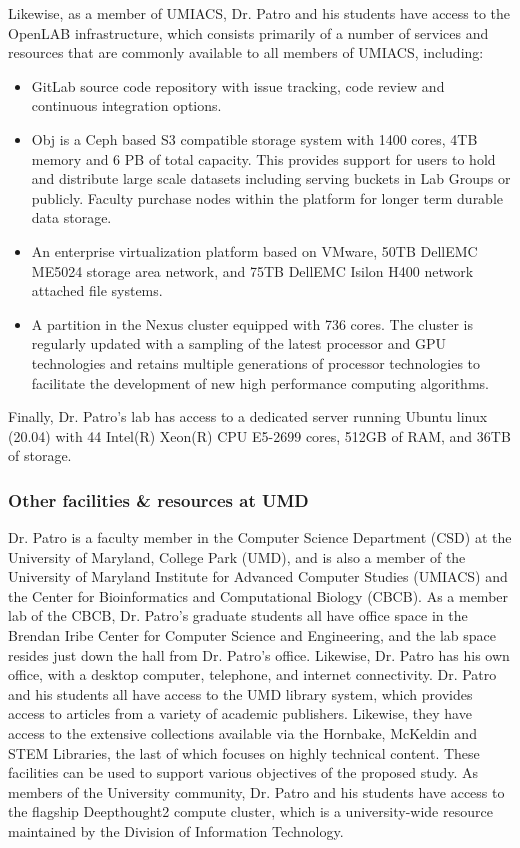Likewise, as a member of UMIACS, Dr. Patro and his students have access to the OpenLAB infrastructure, which consists primarily of a number of services and resources that are commonly available to all members of UMIACS, including:

\begin{itemize}
    \item GitLab source code repository with issue tracking, code review and continuous integration options.

    \item Obj is a Ceph based S3 compatible storage system with 1400 cores, 4TB memory and  6 PB of total capacity.  This provides support for users to hold and distribute large scale datasets including serving buckets in Lab Groups or publicly.  Faculty purchase nodes within the platform for longer term durable data storage.

    \item An enterprise virtualization platform based on VMware, 50TB DellEMC ME5024 storage area network, and 75TB DellEMC Isilon H400 network attached file systems.

    \item A partition in the Nexus cluster equipped with 736 cores.  The cluster is regularly updated with a sampling of the latest processor and GPU technologies and retains multiple generations of processor technologies to facilitate the development of new high performance computing algorithms.
\end{itemize}

Finally, Dr. Patro’s lab has access to a dedicated server running Ubuntu linux (20.04) with 44 Intel(R) Xeon(R) CPU E5-2699 cores, 512GB of RAM, and 36TB of storage.

\subsubsection*{Other facilities \& resources at UMD}

Dr. Patro is a faculty member in the Computer Science Department (CSD) at the University of Maryland, College Park (UMD), and is also a member of the University of Maryland Institute for Advanced Computer Studies (UMIACS) and the Center for Bioinformatics and Computational Biology (CBCB).  As a member lab of the CBCB, Dr. Patro’s graduate students all have office space in the Brendan Iribe Center for Computer Science and Engineering, and the lab space resides just down the hall from Dr. Patro’s office. Likewise, Dr. Patro has his own office, with a desktop computer, telephone, and internet connectivity. Dr. Patro and his students all have access to the UMD library system, which provides access to articles from a variety of academic publishers. Likewise, they have access to the extensive collections available via the Hornbake, McKeldin and STEM Libraries, the last of which focuses on highly technical content. These facilities can be used to support various objectives of the proposed study. As members of the University community, Dr. Patro and his students have access to the flagship Deepthought2 compute cluster, which is a university-wide resource maintained by the Division of Information Technology. 